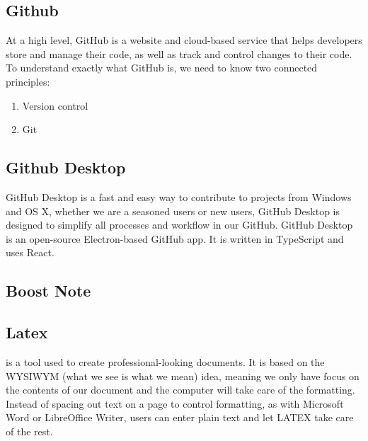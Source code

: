 \subsection{Github}
At a high level, GitHub is a website and cloud-based service that helps developers store and manage their code, as well as track and control changes to their code. To understand exactly what GitHub is, we need to know two connected principles:
\begin{enumerate}
    \item Version control
    \item Git
\end{enumerate}

\subsection{Github Desktop}
GitHub Desktop is a fast and easy way to contribute to projects from Windows and OS X, whether we are a seasoned users or new users, GitHub Desktop is designed to simplify all processes and workflow in our GitHub. GitHub Desktop is an open-source Electron-based GitHub app. It is written in TypeScript and uses React.


\subsection{Boost Note}


\subsection{Latex}
\latex{} is a tool used to create professional-looking documents. It is based on the WYSIWYM (what we see is what we mean) idea, meaning we only have focus on the contents of our document and the computer will take care of the formatting. Instead of spacing out text on a page to control formatting, as with Microsoft Word or LibreOffice Writer, users can enter plain text and let LATEX take care of the rest.

